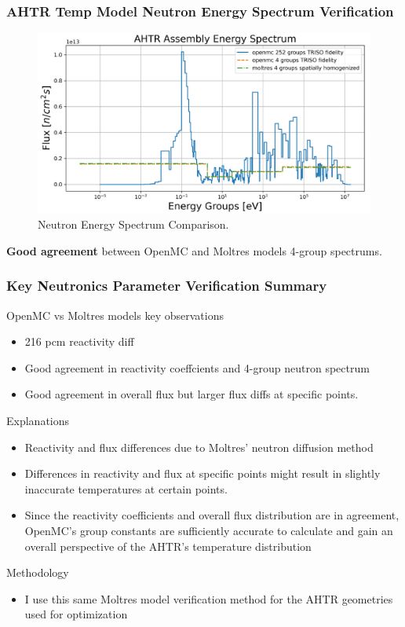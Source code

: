 \begin{frame}
    \frametitle{AHTR Temp Model Neutron Energy Spectrum Verification}
            \begin{figure}[]
                \centering
                \includegraphics[width=0.75\linewidth]{figures/benchmark-spectrum.png} 
                \caption{Neutron Energy Spectrum Comparison.}
            \end{figure}
        \textbf{Good agreement} between OpenMC and Moltres models 4-group spectrums.
\end{frame}

\begin{frame}
    \frametitle{Key Neutronics Parameter Verification Summary}
    OpenMC vs Moltres models key observations 
    \begin{itemize}
        \item 216 pcm reactivity diff 
        \item Good agreement in reactivity coeffcients and 4-group neutron spectrum
        \item Good agreement in overall flux but larger flux diffs at specific points.
    \end{itemize}
    Explanations 
    \begin{itemize}
        \item Reactivity and flux differences due to Moltres' neutron diffusion method 
        \item Differences in reactivity and flux at specific points might result in 
        slightly inaccurate temperatures at certain points.
        \item Since the reactivity coefficients and overall flux distribution 
        are in agreement, OpenMC's group constants are sufficiently accurate to calculate
        and gain an overall perspective of the AHTR's temperature distribution
    \end{itemize}
    Methodology 
    \begin{itemize}
        \item I use this same Moltres model verification method for the AHTR geometries 
        used for optimization 
    \end{itemize}
\end{frame}

